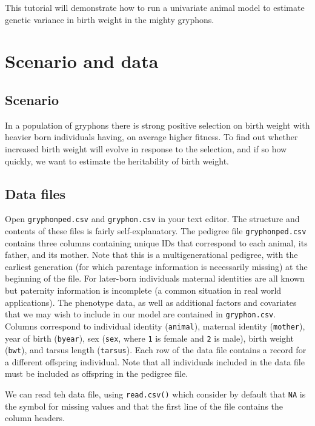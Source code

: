 \documentclass[
  12pt,
]{book}
\begin{document}
This tutorial will demonstrate how to run a univariate animal model to estimate genetic variance in birth weight in the mighty gryphons.

\hypertarget{scenario-and-data}{%
\section{Scenario and data}\label{scenario-and-data}}

\hypertarget{scenario}{%
\subsection{Scenario}\label{scenario}}

In a population of gryphons there is strong positive selection on birth weight with heavier born individuals having, on average higher fitness. To find out whether increased birth weight will evolve in response to the selection, and if so how quickly, we want to estimate the heritability of birth weight.

\hypertarget{data-files-1}{%
\subsection{Data files}\label{data-files-1}}

Open \texttt{gryphonped.csv} and \texttt{gryphon.csv} in your text editor. The structure and contents of these files is fairly self-explanatory. The pedigree file \texttt{gryphonped.csv} contains three columns containing unique IDs that correspond to each animal, its father, and its mother. Note that this is a multigenerational pedigree, with the earliest generation (for which parentage information is necessarily missing) at the beginning of the file. For later-born individuals maternal identities are all known but paternity information is incomplete (a common situation in real world applications).
The phenotype data, as well as additional factors and covariates that we may wish to include in our model are contained in \texttt{gryphon.csv}. Columns correspond to individual identity (\texttt{animal}), maternal identity (\texttt{mother}), year of birth (\texttt{byear}), sex (\texttt{sex}, where \texttt{1} is female and \texttt{2} is male), birth weight (\texttt{bwt}), and tarsus length (\texttt{tarsus}). Each row of the data file contains a record for a different offspring individual. Note that all individuals included in the data file must be included as offspring in the pedigree file.

We can read teh data file, using \texttt{read.csv()} which consider by default that \texttt{NA} is the symbol for missing values and that the first line of the file contains the column headers.
\end{document}
